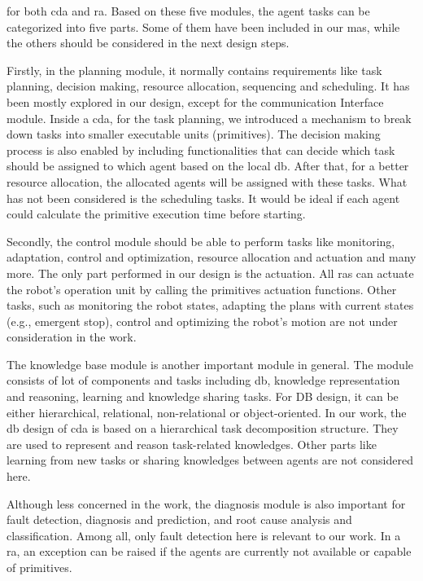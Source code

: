 for both \gls{cda} and \gls{ra}.
Based on these five modules, the agent tasks can be categorized into five parts. Some 
of them have been included in our \gls{mas}, while the others should be considered in the 
next design steps. 


Firstly, in the planning module, it normally contains requirements like task planning, 
decision making, 
resource allocation, sequencing and scheduling. It has been mostly explored in our 
design, except for the communication Interface module. Inside a \gls{cda}, 
for the task planning, we introduced 
a mechanism to break down tasks into smaller executable units (primitives). 
The decision 
making process is also enabled by including functionalities that can decide which task should be 
assigned to which agent based on the local \gls{db}. After that, for a better resource 
allocation, the allocated agents will be assigned with these tasks. What has not been 
considered is the scheduling tasks. It would be ideal if each agent could calculate 
the primitive execution time before starting.

Secondly, the control module should be able to perform tasks like monitoring, adaptation, 
control and optimization, resource allocation and actuation and many more. The only part 
performed in our design is the actuation. All \gls{ras} can actuate the robot's operation 
unit by calling the primitives actuation functions. Other tasks, such as monitoring the 
robot states, adapting the plans with current states (e.g., emergent stop), control and 
optimizing the robot's motion are not under consideration in the work. 


The knowledge base module is another important module in general. 
The module consists of lot of components and tasks including \gls{db}, knowledge representation and reasoning, learning and knowledge 
sharing tasks. For DB design, it can be either hierarchical, relational, non-relational 
or object-oriented. In our work, the \gls{db} design of \gls{cda} is based on a 
hierarchical task decomposition structure. They are used to represent and reason task-related 
knowledges. 
Other parts like learning from new tasks or sharing knowledges between agents are not considered here.  


Although less concerned in the work, the diagnosis module is also important for fault 
detection, diagnosis and prediction, and root cause analysis and classification. Among all, 
only fault detection here is relevant to our work. In a \gls{ra}, an exception can be raised 
if the agents are currently not available or capable of primitives. 



